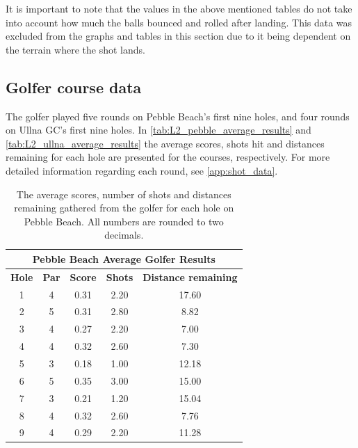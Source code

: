 \documentclass{kththesis}
\begin{document}
It is important to note that the values in the above mentioned tables do not take into account how much the balls bounced and rolled after landing. This data was excluded from the graphs and tables in this section due to it being dependent on the terrain where the shot lands.

\subsection{Golfer course data}
The golfer played five rounds on Pebble Beach's first nine holes, and four rounds on Ullna GC's first nine holes. In \autoref{tab:L2_pebble_average_results} and \autoref{tab:L2_ullna_average_results} the average scores, shots hit and distances remaining for each hole are presented for the courses, respectively. For more detailed information regarding each round, see \autoref{app:shot_data}.

\begin{table}
    \centering
    \begin{tabular}{|c|c|c|c|c|} \hline
    \multicolumn{5}{|c|}{\textbf{Pebble Beach Average Golfer Results}} \\ \hline
        \textbf{Hole} & \textbf{Par} & \textbf{Score} & \textbf{Shots} & \textbf{Distance remaining}  \\ \hline
        1 & 4 & 0.31 & 2.20 & 17.60 \\ \hline
        2 & 5 & 0.31 & 2.80 & 8.82 \\ \hline
        3 & 4 & 0.27 & 2.20 & 7.00 \\ \hline
        4 & 4 & 0.32 & 2.60 & 7.30 \\ \hline
        5 & 3 & 0.18 & 1.00 & 12.18 \\ \hline
        6 & 5 & 0.35 & 3.00 & 15.00 \\ \hline
        7 & 3 & 0.21 & 1.20 & 15.04 \\ \hline
        8 & 4 & 0.32 & 2.60 & 7.76 \\ \hline
        9 & 4 & 0.29 & 2.20 & 11.28 \\ \hline
    \end{tabular}
    \caption{The average scores, number of shots and distances remaining gathered from the golfer for each hole on Pebble Beach. All numbers are rounded to two decimals.}
    \label{tab:L2_pebble_average_results}
\end{table}
\end{document}
